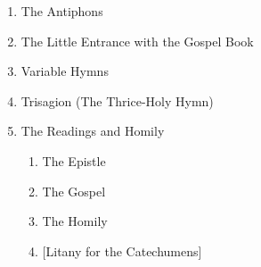 \documentclass[
]{article}
\begin{document}
\begin{enumerate}
\def\labelenumi{\arabic{enumi}.}
\item
  The Antiphons
\item
  The Little Entrance with the Gospel Book
\item
  Variable Hymns
\item
  Trisagion (The Thrice-Holy Hymn)
\item
  The Readings and Homily

  \begin{enumerate}
  \def\labelenumii{\arabic{enumii}.}
  \item
    The Epistle
  \item
    The Gospel
  \item
    The Homily
  \item
    {[}Litany for the Catechumens{]}
  \end{enumerate}
\end{enumerate}
\end{document}
